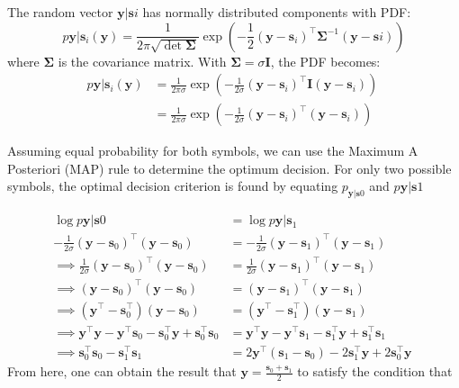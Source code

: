 \documentclass[12pt]{book}
\let\vec\mathbf
\begin{document}
\begin{enumerate}
The random vector $\vec{y}|\vec{s}i$ has normally distributed components with PDF:
\begin{equation}
p{\vec{y}|\vec{s}_i}\left(\vec{y}\right) = \frac{1}{2\pi\sqrt{\det{\vec{\Sigma}}}} \exp\left(-\frac{1}{2}\left(\vec{y}-\vec{s}_i\right)^\top \vec{\Sigma}^{-1} \left(\vec{y}-\vec{s}i\right)\right)
\end{equation}
where $\vec{\Sigma}$ is the covariance matrix. With $\vec{\Sigma} = \sigma \vec{I}$, the PDF becomes:
\begin{align}
p{\vec{y}|\vec{s}_i}\left(\vec{y}\right) &= \frac{1}{2 \pi \sigma} \exp\left(-\frac{1}{2 \sigma}\left(\vec{y}-\vec{s}_i\right)^\top \vec{I} \left(\vec{y}-\vec{s}_i\right)\right) \ \\
&= \frac{1}{2 \pi \sigma} \exp\left(-\frac{1}{2 \sigma}\left(\vec{y}-\vec{s}_i\right)^\top \left(\vec{y}-\vec{s}_i\right)\right)
\end{align}

Assuming equal probability for both symbols, we can use the Maximum A Posteriori (MAP) rule to determine the optimum decision. For only two possible symbols, the optimal decision criterion is found by equating $p_{\vec{y}|\vec{s}0}$ and $p{\vec{y}|\vec{s}1}$


\begin{align*}
\log p{\vec{y}|\vec{s}0} &= \log p{\vec{y}|\vec{s}_1} \\
-\frac{1}{2 \sigma}\left(\vec{y}-\vec{s}_0\right)^\top \left(\vec{y}-\vec{s}_0\right) &= -\frac{1}{2 \sigma}\left(\vec{y}-\vec{s}_1\right)^\top \left(\vec{y}-\vec{s}_1\right) \\
\implies \frac{1}{2 \sigma}\left(\vec{y}-\vec{s}_0\right)^\top \left(\vec{y}-\vec{s}_0\right) &= \frac{1}{2 \sigma}\left(\vec{y}-\vec{s}_1\right)^\top \left(\vec{y}-\vec{s}_1\right) \\
\implies \left(\vec{y}-\vec{s}_0\right)^\top \left(\vec{y}-\vec{s}_0\right) &= \left(\vec{y}-\vec{s}_1\right)^\top \left(\vec{y}-\vec{s}_1\right) \\
\implies \left(\vec{y}^\top -\vec{s}_0^\top\right)\left(\vec{y}-\vec{s}_0\right) &= \left(\vec{y}^\top -\vec{s}_1^\top\right)\left(\vec{y}-\vec{s}_1\right) \\
\implies \vec{y}^\top \vec{y} - \vec{y}^\top\vec{s}_0 - \vec{s}_0^\top\vec{y} + \vec{s}_0^\top\vec{s}_0 &= \vec{y}^\top \vec{y} - \vec{y}^\top\vec{s}_1 - \vec{s}_1^\top\vec{y} + \vec{s}_1^\top\vec{s}_1 \\
\implies \vec{s}_0^\top\vec{s}_0 - \vec{s}_1^\top\vec{s}_1 &= 2\vec{y}^\top(\vec{s}_1-\vec{s}_0) - 2\vec{s}_1^\top\vec{y} + 2\vec{s}_0^\top\vec{y} \
\end{align*}
From here, one can obtain the result that $\vec{y} = \frac{\vec{s}_0+\vec{s}_1}{2}$ to satisfy the condition that 


\end{enumerate}
\end{document}
